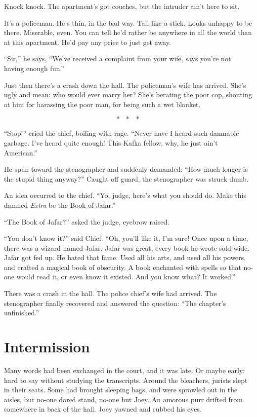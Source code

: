 \documentclass[oneside]{book}
\begin{document}
Knock knock.  The apartment's got couches, but the intruder ain't here to sit.

It's a policeman.  He's thin, in the bad way.
Tall like a stick.  Looks unhappy to be there.  Miserable, even.  You can tell he'd
rather be anywhere in all the world than at this apartment.  He'd pay any price to just
get away.

``Sir,'' he says, ``We've received a complaint from your wife, says you're not having enough fun.''

Just then there's a crash down the hall.  The policeman's wife has arrived.  She's ugly and mean: who would
ever marry her?  She's berating the poor cop, shouting at him for harassing the poor man, for being
such a wet blanket.

\[*\mbox{ }*\mbox{ }*\]

``Stop!'' cried the chief, boiling with rage.
``Never have I heard such damnable garbage.
I've heard quite enough!  This Kafka fellow, why, he just ain't American.''

He spun toward the stenographer and suddenly demanded:  ``How much longer
is the stupid thing anyway?''  Caught off guard, the stenographer was
struck dumb.

An idea occurred to the chief.
``Yo, judge, here's what you should do.  Make this damned \emph{Extra} be the Book
of Jafar.''

``The Book of Jafar?'' asked the judge, eyebrow raised.

``You don't know it?'' said Chief.  ``Oh, you'll like it, I'm sure!
Once upon a time, there was a wizard named Jafar.
Jafar was great, every book he wrote sold wide.
Jafar got fed up.  He hated that fame.  Used all his
arts, and used all his powers, and crafted a magical book of obscurity.
A book enchanted with spells so that no-one would read it, or even know
it existed.  And you know what?  It worked.''

There was a crash in the hall.  The police chief's wife had arrived.
The stenographer finally recovered and answered the question:
``The chapter's unfinished.''

\chapter{Intermission}

Many words had been exchanged in the court, and it was late.
Or maybe early: hard to say without studying the
transcripts.  Around the bleachers, jurists slept in their seats.
Some had brought sleeping bags, and were
sprawled out in the aisles, but no-one dared stand, no-one but
Joey.  An amorous purr drifted from somewhere in back of the
hall.  Joey yawned and rubbed
his eyes.
\end{document}

